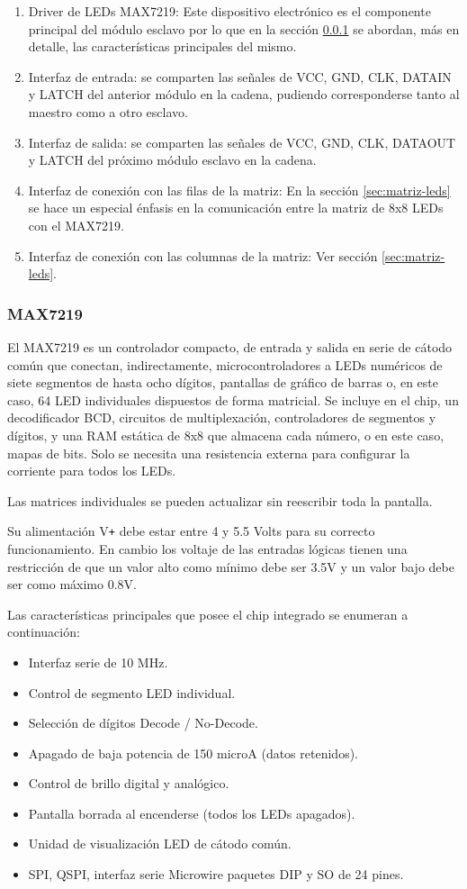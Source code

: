 \begin{enumerate}
	\item Driver de LEDs MAX7219: Este dispositivo electrónico es el componente principal del módulo esclavo por lo que en la sección \ref{sec:max7219} se abordan, más en detalle, las características principales del mismo.
	\item Interfaz de entrada: se comparten las señales de VCC, GND, CLK, DATAIN y LATCH del anterior módulo en la cadena, pudiendo corresponderse tanto al maestro como a otro esclavo.
	\item Interfaz de salida: se comparten las señales de VCC, GND, CLK, DATAOUT y LATCH del próximo módulo esclavo en la cadena.
	\item Interfaz de conexión con las filas de la matriz: En la sección \ref{sec:matriz-leds} se hace un especial énfasis en la comunicación entre la matriz de 8x8 LEDs con el MAX7219.
	\item Interfaz de conexión con las columnas de la matriz: Ver sección \ref{sec:matriz-leds}.
\end{enumerate}

\subsubsection{MAX7219}\label{sec:max7219}
El MAX7219 es un controlador compacto, de entrada y salida en serie de cátodo común que conectan, indirectamente, microcontroladores a LEDs numéricos de siete segmentos de hasta ocho dígitos, pantallas de gráfico de barras o, en este caso, 64 LED individuales dispuestos de forma matricial. Se incluye en el chip, un decodificador BCD, circuitos de multiplexación, controladores de segmentos y dígitos, y una RAM estática de 8x8 que almacena cada número, o en este caso, mapas de bits. Solo se necesita una resistencia externa para configurar la corriente para todos los LEDs.

Las matrices individuales se pueden actualizar sin reescribir toda la pantalla.

Su alimentación V\texttt{+} debe estar entre 4 y 5.5 Volts para su correcto funcionamiento. En cambio los voltaje de las entradas lógicas tienen una restricción de que un valor alto como mínimo debe ser 3.5V y un valor bajo debe ser como máximo 0.8V.

Las características principales que posee el chip integrado se enumeran a continuación:
\begin{itemize}
	\item Interfaz serie de 10 MHz.
	\item Control de segmento LED individual.
	\item Selección de dígitos Decode / No-Decode.
	\item Apagado de baja potencia de 150 microA (datos retenidos).
	\item Control de brillo digital y analógico.
	\item Pantalla borrada al encenderse (todos los LEDs apagados).
	\item Unidad de visualización LED de cátodo común.
	\item SPI, QSPI, interfaz serie Microwire paquetes DIP y SO de 24 pines.
\end{itemize}

